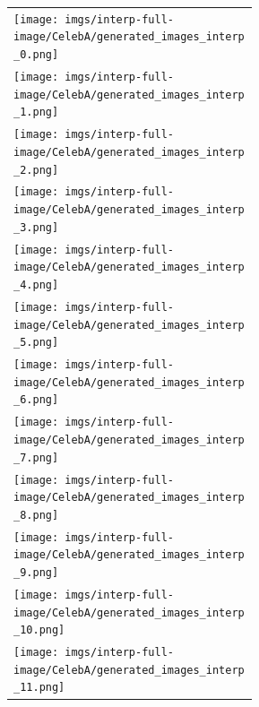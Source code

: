 \documentclass{article}
\begin{document}
\begin{appendices}
\begin{figure}[H]
{\begin{tabular}{C{0.35\linewidth}}
            \texttt{[image: imgs/interp-full-image/CelebA/generated\_images\_interp\_0.png]} \\
            \texttt{[image: imgs/interp-full-image/CelebA/generated\_images\_interp\_1.png]} \\
            \texttt{[image: imgs/interp-full-image/CelebA/generated\_images\_interp\_2.png]} \\
            \texttt{[image: imgs/interp-full-image/CelebA/generated\_images\_interp\_3.png]} \\
            \texttt{[image: imgs/interp-full-image/CelebA/generated\_images\_interp\_4.png]} \\
            \texttt{[image: imgs/interp-full-image/CelebA/generated\_images\_interp\_5.png]} \\
            \texttt{[image: imgs/interp-full-image/CelebA/generated\_images\_interp\_6.png]} \\
            \texttt{[image: imgs/interp-full-image/CelebA/generated\_images\_interp\_7.png]} \\
            \texttt{[image: imgs/interp-full-image/CelebA/generated\_images\_interp\_8.png]} \\
            \texttt{[image: imgs/interp-full-image/CelebA/generated\_images\_interp\_9.png]} \\
            \texttt{[image: imgs/interp-full-image/CelebA/generated\_images\_interp\_10.png]} \\
            \texttt{[image: imgs/interp-full-image/CelebA/generated\_images\_interp\_11.png]} \\
        \end{tabular}}
        

\end{figure}
\end{appendices}
\end{document}
